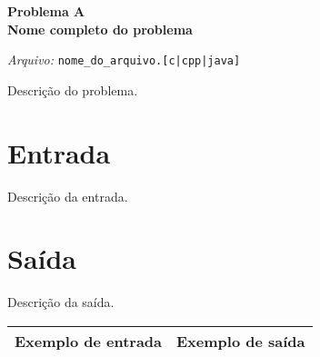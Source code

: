 \newpage

\begin{center}
\LARGE{\textbf{Problema A} \\ \textbf{Nome completo do problema}} 

\vspace{0.5em}
\normalsize

\textit{Arquivo:}
\verb+nome_do_arquivo.[c|cpp|java]+  

\end{center}

Descrição do problema. \\

\section*{Entrada}

Descrição da entrada. \\

\section*{Saída}

Descrição da saída. \\

\begin{center}
  \begin{tabular}{ | l | l | }
    \hline
    \textbf{Exemplo de entrada} & \textbf{Exemplo de saída} \\ 
    \hline
	
	\hline
  \end{tabular}
\end{center}